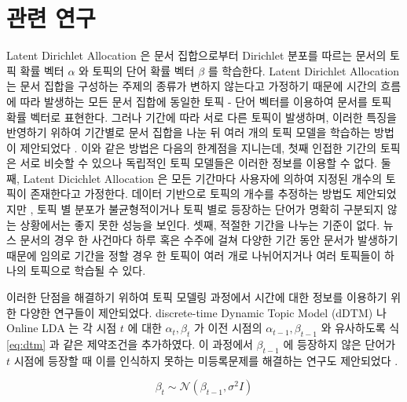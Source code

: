 \documentclass[oneside, ko,phd]{snuthesis_utf8_kor}
\begin{document}
\section{관련 연구}

Latent Dirichlet Allocation 은 문서 집합으로부터 Dirichlet 분포를 따르는 문서의 토픽 확률 벡터 $\alpha$ 와 토픽의 단어 확률 벡터 $\beta$ 를 학습한다.
Latent Dirichlet Allocation 는 문서 집합을 구성하는 주제의 종류가 변하지 않는다고 가정하기 때문에 시간의 흐름에 따라 발생하는 모든 문서 집합에 동일한 토픽 - 단어 벡터를 이용하여 문서를 토픽 확률 벡터로 표현한다.
그러나 기간에 따라 서로 다른 토픽이 발생하며, 이러한 특징을 반영하기 위하여 기간별로 문서 집합을 나눈 뒤 여러 개의 토픽 모델을 학습하는 방법이 제안되었다 \cite{blei2006dynamic, mei2007topic, alsumait2008line}.
이와 같은 방법은 다음의 한계점을 지니는데, 첫째 인접한 기간의 토픽은 서로 비슷할 수 있으나 독립적인 토픽 모델들은 이러한 정보를 이용할 수 없다.
둘째, Latent Dicichlet Allocation 은 모든 기간마다 사용자에 의하여 지정된 개수의 토픽이 존재한다고 가정한다. 
데이터 기반으로 토픽의 개수를 추정하는 방법도 제안되었지만 \cite{wang2011online}, 토픽 별 분포가 불균형적이거나 토픽 별로 등장하는 단어가 명확히 구분되지 않는 상황에서는 좋지 못한 성능을 보인다.
셋째, 적절한 기간을 나누는 기준이 없다.
뉴스 문서의 경우 한 사건마다 하루 혹은 수주에 걸쳐 다양한 기간 동안 문서가 발생하기 때문에 임의로 기간을 정할 경우 한 토픽이 여러 개로 나뉘어지거나 여러 토픽들이 하나의 토픽으로 학습될 수 있다.

이러한 단점을 해결하기 위하여 토픽 모델링 과정에서 시간에 대한 정보를 이용하기 위한 다양한 연구들이 제안되었다.
discrete-time Dynamic Topic Model (dDTM) \cite{blei2006dynamic} 나 Online LDA \cite{alsumait2008line} 는 각 시점 $t$ 에 대한 $\alpha_t, \beta_t$ 가 이전 시점의 $\alpha_{t-1}, \beta_{t-1}$ 와 유사하도록 식 \ref{eq:dtm} 과 같은 제약조건을 추가하였다. 이 과정에서 $\beta_{t-1}$ 에 등장하지 않은 단어가 $t$ 시점에 등장할 때 이를 인식하지 못하는 미등록문제를 해결하는 연구도 제안되었다 \cite{zhai2013online}.

\begin{equation}
\label{eq:dtm}
\beta_t \sim \mathcal{N}(\beta_{t-1}, \sigma^2 \mathit{I})
\end{equation}
\end{document}
